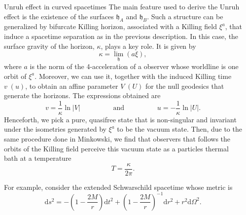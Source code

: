 \documentclass[final, border=3pt]{beamer}
\newlength{\sepwid}
\newlength{\onecolwid}
\begin{document}
\begin{frame}[t]
\begin{columns}[t]
                  
                  
            \begin{column}{\sepwid}  \end{column}

         
        \begin{column}{\onecolwid} %
          
            \begin{block}{Unruh effect in curved spacetimes}
                The main feature used to derive the Unruh effect is the existence of the surfaces \(\mathfrak{h}_A\) and \(\mathfrak{h}_B\). Such a structure can be generalized by bifurcate Killing horizon, associated with a Killing field \(\xi^a\), that induce a spacetime separation as in the previous description. 
                In this case, the surface gravity of the horizon, \(\kappa\), plays a key role. It is given by
                \begin{equation}
                    \kappa=\lim_{\mathfrak{h}}(a\xi),
                \end{equation}
                where \(a\) is the norm of the 4-acceleration of a observer whose worldline is one orbit of \(\xi^a\). Moreover, we can use it, together with the induced Killing time \(v\;(u)\), to obtain an affine parameter \(V\;(U)\) for the null geodesics that generate the horizons. The expressions obtained are
                \begin{equation}
                    v=\frac{1}{\kappa}\ln{\lvert V\rvert}\hspace{2cm}\text{and}\hspace{2cm}u=-\frac{1}{\kappa}\ln{\lvert U\rvert}.
                \end{equation}
                Henceforth, we pick a pure, quasifree state that is non-singular and invariant under the isometries generated by \(\xi^a\) to be the vacuum state. Then, due to the same procedure done in Minkowski, we find that observers that follows the orbits of the Killing field perceive this vacuum state as a particles thermal bath at a temperature
                \begin{equation}
                    T=\frac{\kappa}{2\pi}.
                \end{equation}

                For example, consider the extended Schwarschild spacetime whose metric is
                \begin{equation}
                    \mathrm{d}s^2=-\left(1-\frac{2M}{r}\right)\mathrm{d}t^2+\left(1-\frac{2M}{r}\right)^{-1}\mathrm{d}r^2+r^2\mathrm{d}\Omega^2.
                \end{equation}


\end{block}
\end{column}
\end{columns}
\end{frame}
\end{document}
